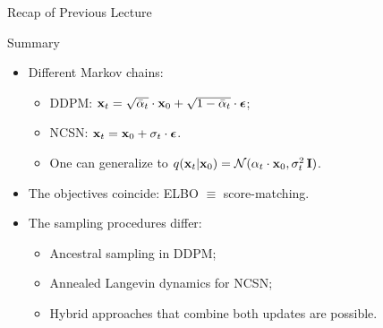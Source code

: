 \documentclass{beamer}
\begin{document}
\begin{frame}{Recap of Previous Lecture}
	\begin{block}{Summary}
		\begin{itemize}
		\item Different Markov chains:
			\begin{itemize}
				\item DDPM: $\mathbf{x}_t = \sqrt{\bar{\alpha}_t} \cdot \mathbf{x}_0 + \sqrt{1 - \bar{\alpha}_t} \cdot \boldsymbol{\epsilon}$;
				\item NCSN: $\mathbf{x}_t = \mathbf{x}_0 + \sigma_t \cdot \boldsymbol{\epsilon}$.
				\item One can generalize to $q(\mathbf{x}_t |\mathbf{x}_0) = \mathcal{N}(\alpha_t \cdot \mathbf{x}_0, \sigma^2_t\, \mathbf{I})$.
			\end{itemize}
		\eqpause
		\item The objectives coincide: ELBO $\equiv$ score-matching.
		\eqpause
		\item The sampling procedures differ:
			\begin{itemize}
				\item Ancestral sampling in DDPM;
				\item Annealed Langevin dynamics for NCSN;
				\item Hybrid approaches that combine both updates are possible.
			\end{itemize}
		\end{itemize}
	\end{block}
\end{frame}
\end{document}
